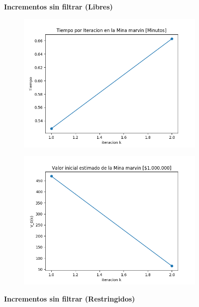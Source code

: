\documentclass[12pt,letterpaper]{article}
\begin{document}
\begin{figure}[H]
  \textbf{Incrementos sin filtrar (Libres)}
  
  \begin{subfigure}[b]{0.4\textwidth}
     \includegraphics[width=\textwidth]{Graficos/sin_filtrar/libre/marvinml_inc_times.png}
     \caption{}
     \label{fig:ex1}
  \end{subfigure}
  \begin{subfigure}[b]{0.4\textwidth}
     \includegraphics[width=\textwidth]{Graficos/sin_filtrar/libre/marvinml_inc_v_k.png}
     \caption{}
     \label{fig:ex2}
  \end{subfigure}

  \textbf{Incrementos sin filtrar (Restringidos)}
  

\end{figure}
\end{document}
